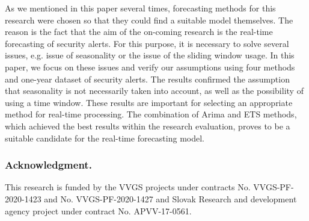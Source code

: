 \documentclass[runningheads]{llncs}
\begin{document}
As we mentioned in this paper several times, forecasting methods for this research were chosen so that they could find a suitable model themselves. The reason is the fact that the aim of the on-coming research is the real-time forecasting of security alerts. For this purpose, it is necessary to solve several issues,  e.g. issue of seasonality or the issue of the sliding window usage. In this paper, we focus on these issues and verify our assumptions using four methods and one-year dataset of security alerts. The results confirmed the assumption that seasonality is not necessarily taken into account, as well as the possibility of using a time window. These results are important for selecting an appropriate method for real-time processing. The combination of Arima and ETS methods, which achieved the best results within the research evaluation, proves to be a suitable candidate for the real-time forecasting model.

\subsubsection*{Acknowledgment.}
This research is funded by the VVGS projects under contracts No. VVGS-PF-2020-1423 and No. VVGS-PF-2020-1427 and Slovak Research and development agency project under contract No. APVV-17-0561.



\end{document}
